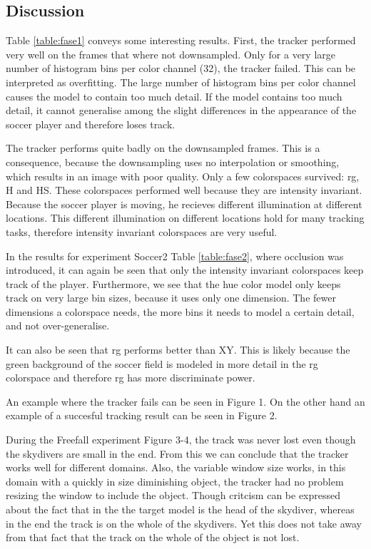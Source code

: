 \documentclass[a4paper,11pt]{article}
\begin{document}
\subsection{Discussion}
Table \ref{table:fase1} conveys some interesting results. First, the tracker performed very well on the frames that where not
downsampled. Only for a very large number of histogram bins per color channel (32), the tracker failed. This can be
interpreted as overfitting. The large number of histogram bins per color channel causes the model to
contain too much detail. If the model contains too much detail, it cannot
generalise among the slight differences in the appearance  of the soccer player and therefore loses track.

The tracker performs quite badly on the downsampled frames. This is a consequence, because  the downsampling uses no interpolation or smoothing, which results in an image with poor quality. Only a few colorspaces
survived: rg, H and HS. These colorspaces performed well because they are
intensity invariant. Because the soccer player is moving, he recieves different
illumination at different locations. This different illumination on different
locations hold for many tracking tasks, therefore intensity
invariant colorspaces are very useful.

In the results for experiment Soccer2 Table \ref{table:fase2}, where occlusion was introduced, it can again be seen  that only the intensity
invariant colorspaces keep track of the player. Furthermore, we see that the hue
color model only keeps track on very large bin sizes, because it uses
only one dimension. The fewer dimensions a colorspace needs, the more bins it
needs to model a certain detail, and not over-generalise.

It can also be seen that rg performs better than XY. This is likely because the green
background of the soccer field is modeled in more detail in the rg colorspace and
therefore rg has more discriminate power.

An example where the tracker fails can be seen in Figure 1. On the
other hand an example of a succesful tracking result can be seen in
Figure 2.

During the Freefall experiment Figure 3-4, the track was never lost even though the skydivers are small in the end. From this we can conclude that the tracker works well for different domains. Also, the variable window size works, in this domain with a quickly in size diminishing object, the tracker had no problem resizing the window to include the object. Though critcism can be expressed about the fact that in the the target model is the head of the skydiver, whereas in the end the track is on the whole of the skydivers. Yet this does not take away from that fact that the track on the whole of the object is not lost.  
\end{document}
